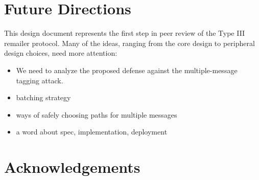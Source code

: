 \documentclass{llncs}
\begin{document}

\section{Future Directions}
\label{sec:conclusion}

This design document represents the first step in peer review of the
Type III remailer protocol. Many of the ideas, ranging from the core
design to peripheral design choices, need more attention:

\begin{itemize}
\item We need to analyze the proposed defense against the multiple-message
tagging attack.
\item batching strategy
\item ways of safely choosing paths for multiple messages
\item a word about spec, implementation, deployment
\end{itemize}




\section*{Acknowledgements}





\end{document}
